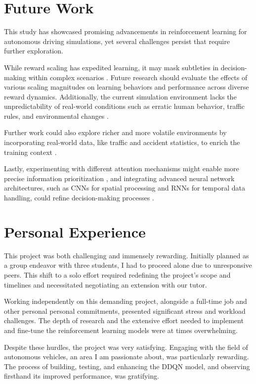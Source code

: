 \documentclass{article}
\begin{document}
\section{Future Work}

This study has showcased promising advancements in reinforcement learning for autonomous driving simulations, yet several challenges persist that require further exploration.

While reward scaling has expedited learning, it may mask subtleties in decision-making within complex scenarios \citep{silver2016mastering}. Future research should evaluate the effects of various scaling magnitudes on learning behaviors and performance across diverse reward dynamics. Additionally, the current simulation environment lacks the unpredictability of real-world conditions such as erratic human behavior, traffic rules, and environmental changes \citep{dosovitskiy2017carla}.

Further work could also explore richer and more volatile environments by incorporating real-world data, like traffic and accident statistics, to enrich the training context \citep{bojarski2016end}. 

Lastly, experimenting with different attention mechanisms might enable more precise information prioritization \citep{DBLP:journals/corr/VaswaniSPUJGKP17}, and integrating advanced neural network architectures, such as CNNs for spatial processing and RNNs for temporal data handling, could refine decision-making processes \citep{lecun2015deep}.

\section{Personal Experience}

This project was both challenging and immensely rewarding. Initially planned as a group endeavor with three students, I had to proceed alone due to unresponsive peers. This shift to a solo effort required redefining the project's scope and timelines and necessitated negotiating an extension with our tutor.

Working independently on this demanding project, alongside a full-time job and other personal personal commitments, presented significant stress and workload challenges. The depth of research and the extensive effort needed to implement and fine-tune the reinforcement learning models were at times overwhelming.

Despite these hurdles, the project was very satisfying. Engaging with the field of autonomous vehicles, an area I am passionate about, was particularly rewarding. The process of building, testing, and enhancing the DDQN model, and observing firsthand its improved performance, was gratifying.
\end{document}
